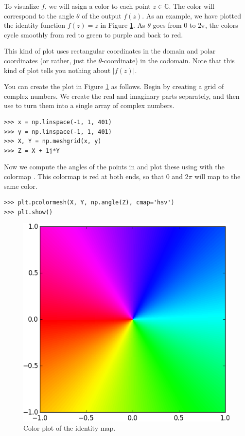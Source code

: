 To visualize $f$, we will asign a color to each point $z \in \mathbb{C}$. 
The color will correspond to the angle $\theta$ of the output $f(z)$. 
As an example, we have plotted the identity function $f(z)=z$ in Figure \ref{fig:identity}.
As $\theta$ goes from 0 to $2\pi$, the colors cycle smoothly from red to green to purple and back to red.

This kind of plot uses rectangular coordinates in the domain and polar coordinates (or rather, just the $\theta$-coordinate) in the codomain.
Note that this kind of plot tells you nothing about $|f(z)|$.

You can create the plot in Figure \ref{fig:identity} as follows.
Begin by creating a grid of complex numbers.
We create the real and imaginary parts separately, and then use  to turn them into a single array of complex numbers.
\begin{lstlisting}
>>> x = np.linspace(-1, 1, 401)
>>> y = np.linspace(-1, 1, 401)
>>> X, Y = np.meshgrid(x, y)
>>> Z = X + 1j*Y
\end{lstlisting}

Now we compute the angles of the points in  and plot these using  with the colormap . 
This colormap is red at both ends, so that $0$ and $2 \pi$ will map to the same color.

\begin{lstlisting}
>>> plt.pcolormesh(X, Y, np.angle(Z), cmap='hsv')
>>> plt.show()
\end{lstlisting}


\begin{figure}
\includegraphics[width=\textwidth]{Identity.png}
\caption{Color plot of the identity map.}
\label{fig:identity}
\end{figure}





